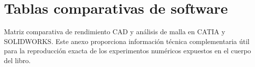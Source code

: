 \chapter{Tablas comparativas de software}
\label{chap:anexoE}

Matriz comparativa de rendimiento CAD y análisis de malla en CATIA y SOLIDWORKS.
Este anexo proporciona información técnica complementaria útil para la reproducción exacta de los experimentos numéricos expuestos en el cuerpo del libro.
